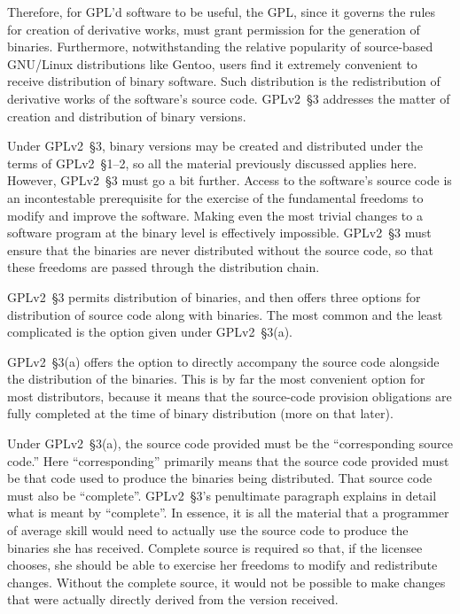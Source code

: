 Therefore, for GPL'd software to be useful, the GPL, since it governs the
rules for creation of derivative works, must grant permission for the
generation of binaries.  Furthermore, notwithstanding the relative
popularity of source-based GNU/Linux distributions like Gentoo, users find
it extremely convenient to receive distribution of binary software.  Such
distribution is the redistribution of derivative works of the software's
source code.  GPLv2~\S3 addresses the matter of creation and distribution of
binary versions.

Under GPLv2~\S3, binary versions may be created and distributed under the
terms of GPLv2~\S1--2, so all the material previously discussed applies
here.  However, GPLv2~\S3 must go a bit further.  Access to the software's
source code is an incontestable prerequisite for the exercise of the
fundamental freedoms to modify and improve the software.  Making even
the most trivial changes to a software program at the binary level is
effectively impossible.  GPLv2~\S3 must ensure that the binaries are never
distributed without the source code, so that these freedoms are passed
through the distribution chain.

GPLv2~\S3 permits distribution of binaries, and then offers three options for
distribution of source code along with binaries. The most common and the
least complicated is the option given under GPLv2~\S3(a).

GPLv2~\S3(a) offers the option to directly accompany the source code alongside
the distribution of the binaries.  This is by far the most convenient
option for most distributors, because it means that the source-code
provision obligations are fully completed at the time of binary
distribution (more on that later).

Under GPLv2~\S3(a), the source code provided must be the ``corresponding source
code.''  Here ``corresponding'' primarily means that the source code
provided must be that code used to produce the binaries being distributed.
That source code must also be ``complete''.   GPLv2~\S3's penultimate paragraph
explains in detail what is meant by ``complete''.  In essence, it is all
the material that a programmer of average skill would need to actually use
the source code to produce the binaries she has received.  Complete source
is required so that, if the licensee chooses, she should be able to
exercise her freedoms to modify and redistribute changes.  Without the
complete source, it would not be possible to make changes that were
actually directly derived from the version received.

